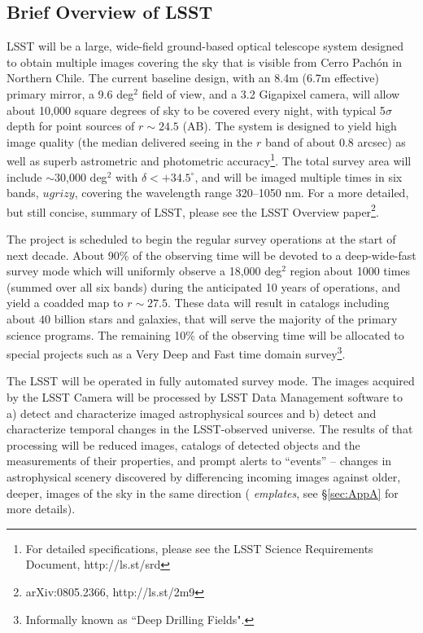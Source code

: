 \subsection{Brief Overview of LSST} 

LSST will be a large, wide-field ground-based optical telescope system
designed to obtain multiple images covering the sky that is visible
from Cerro Pach\'{o}n in Northern Chile. The current baseline design,
with an 8.4m (6.7m effective) primary mirror, a 9.6 deg$^2$ field of
view, and a 3.2 Gigapixel camera, will allow about 10,000 square
degrees of sky to be covered every night, with typical 5$\sigma$ depth 
for point sources of $r\sim24.5$ (AB). The system is designed to yield 
high image quality (the median delivered seeing in the $r$ band of 
about 0.8 arcsec) as well as superb astrometric  and photometric 
accuracy\footnote{For detailed specifications, please see the LSST
Science Requirements Document, http://ls.st/srd}. The total survey
area will include $\sim$30,000 deg$^2$ with $\delta<+34.5^\circ$, and 
will be imaged multiple times in six bands, $ugrizy$, covering the 
wavelength range 320--1050 nm. For a more detailed, but still concise,
summary of LSST, please see 
the LSST Overview paper\footnote{arXiv:0805.2366, http://ls.st/2m9}. 

The project is scheduled to  begin the regular survey operations at
the start of next decade. About 90\% of the observing time will be
devoted to a deep-wide-fast survey mode which will uniformly observe 
a 18,000 deg$^2$ region about 1000 times (summed over all six bands) 
during the anticipated 10 years of operations, and yield a coadded map 
to $r\sim27.5$. These data will result in catalogs including about
$40$ billion stars and galaxies, that will serve the majority of the
primary science programs. The remaining 10\% of the observing time
will be allocated to special projects such as a Very Deep and Fast
time domain survey\footnote{Informally known as ``Deep Drilling Fields".}.

The LSST will be operated in fully automated survey mode. The images
acquired by the LSST Camera will be processed by LSST Data Management
software \cite{juric15} to a) detect and characterize imaged
astrophysical sources and b) detect and characterize temporal changes
in the LSST-observed universe. The results of that processing will be
reduced images, catalogs of detected objects and the measurements of 
their properties, and prompt alerts to ``events'' -- changes in
astrophysical scenery discovered by differencing incoming images
against older, deeper, images of the sky in the same direction ({\em
emplates}, see \S \ref{sec:AppA} for more details). 
